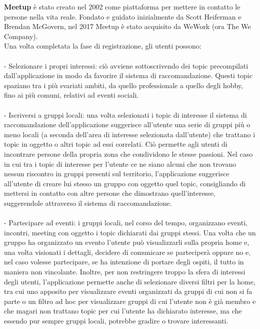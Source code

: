 \documentclass[fleqn,10pt]{SelfArx} %
\begin{document}
{\small %
\textbf{Meetup} è stato creato nel 2002 come piattaforma per mettere in contatto le persone nella vita reale. Fondato e guidato inizialmente da Scott Heiferman e Brendan McGovern, nel 2017 Meetup è stato acquisito da WeWork (ora The We Company). \\
Una volta completata la fase di registrazione, gli utenti possono: \\
\\
- Selezionare i propri interessi: ciò avviene sottoscrivendo dei topic precompilati dall'applicazione in modo da favorire il sistema di raccomandazione. Questi topic spaziano tra i più svariati ambiti, da quello professionale a quello degli hobby, fino ai più comuni, relativi ad eventi sociali. \\
\\
- Iscriversi a gruppi locali: una volta selezionati i topic di interesse il sistema di raccomandazione dell'applicazione suggerisce all'utente una serie di gruppi più o meno locali (a seconda dell'area di interesse selezionata dall'utente) che trattano i topic in oggetto o altri topic ad essi correlati. Ciò permette agli utenti di incontrare persone della propria zona che condividono le stesse passioni. Nel caso in cui tra i topic di interesse per l'utente ce ne siano alcuni che non trovano nessun riscontro in gruppi presenti sul territorio, l'applicazione suggerisce all'utente di creare lui stesso un gruppo con oggetto quel topic, consigliando di mettersi in contatto con altre persone che dimostrano quell'interesse, suggerendole attraverso il sistema di raccomandazione.\\
\\
- Partecipare ad eventi: i gruppi locali, nel corso del tempo, organizzano eventi, incontri, meeting con oggetto i topic dichiarati dai gruppi stessi. Una volta che un gruppo ha organizzato un evento l'utente può visualizzarli sulla propria home e, una volta visionati i dettagli, decidere di comunicare se parteciperà oppure no e, nel caso volesse partecipare, se ha intenzione di portare degli ospiti, il tutto in maniera non vincolante. 
Inoltre, per non restringere troppo la sfera di interessi degli utenti, l'applicazione permette anche di selezionare diversi filtri per la home, tra cui uno apposito per visualizzare eventi organizzati da gruppi di cui non si fa parte o un filtro ad hoc per visualizzare gruppi di cui l'utente non è già membro e che magari non trattano topic per cui l'utente ha dichiarato interesse, ma che essendo pur sempre gruppi locali, potrebbe gradire o trovare interessanti.\\
}
\end{document}
